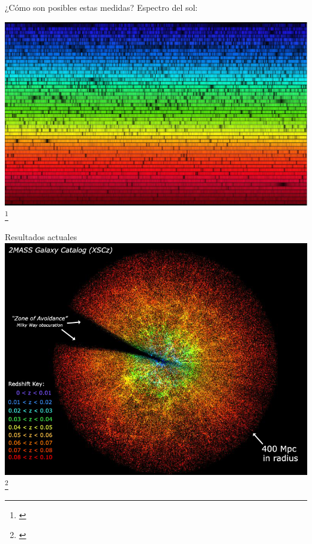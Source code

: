 \documentclass[handout]{beamer}
\newcommand\blfootnote[1]
{%
	\begingroup
	\renewcommand\thefootnote{}\footnote{#1}%
	\addtocounter{footnote}{-1}%
	\endgroup
}
\newcommand{\fcite}[1]{\blfootnote{\cite{#1}}}
\begin{document}
\begin{frame}{¿Cómo son posibles estas medidas?}
	Espectro del sol:
	
	\includegraphics[width = 0.9\linewidth]{sources/images/SolarCCD.jpg}
	\fcite{kenyon_2018}
\end{frame}

\begin{frame}{Resultados actuales}
	\centering
	\includegraphics[width = 0.7\linewidth]{sources/images/2Mass.jpg}	
	\fcite{skrutskie2006two}
\end{frame}
\end{document}
